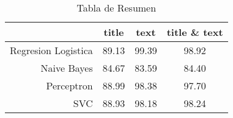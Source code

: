 \begin{table}
\centering
\caption{Tabla de Resumen}
\label{tab:resumen}
\begin{tabular}{rccc}
\toprule
{} &  title &   text &  title \& text \\
\midrule
Regresion Logistica &  89.13 &  99.39 &         98.92 \\
Naive Bayes         &  84.67 &  83.59 &         84.40 \\
Perceptron          &  88.99 &  98.38 &         97.70 \\
SVC                 &  88.93 &  98.18 &         98.24 \\
\bottomrule
\end{tabular}
\end{table}
